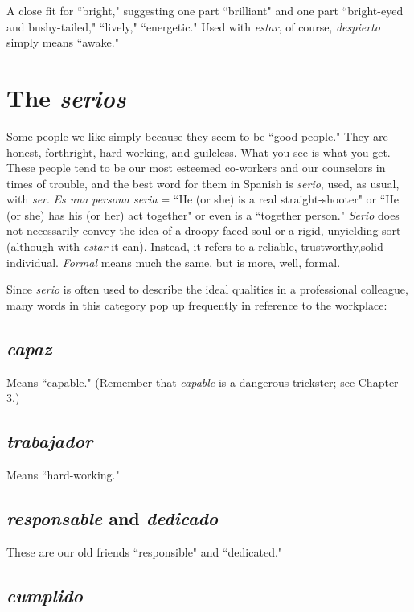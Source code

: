 A close fit for ``bright," suggesting one part ``brilliant" and one part ``bright-eyed and bushy-tailed," ``lively," ``energetic." Used with \emph{estar}, of course, \emph{despierto} simply means ``awake."

\section{The \emph{serios}}

Some people we like simply because they seem to be ``good
people." They are honest, forthright, hard-working, and guileless. What
you see is what you get. These people tend to be our most esteemed
co-workers and our counselors in times of trouble, and the best word
for them in Spanish is \emph{serio}, used, as usual, with \emph{ser}. \emph{Es una persona
	seria} = ``He (or she) is a real straight-shooter" or ``He (or she) has his
(or her) act together" or even is a ``together person." \emph{Serio} does not
necessarily convey the idea of a droopy-faced soul or a rigid, unyielding
sort (although with \emph{estar} it can). Instead, it refers to a reliable, trustworthy,solid individual. \emph{Formal} means much the same, but is more, well, formal.

Since \emph{serio} is often used to describe the ideal qualities in a
professional colleague, many words in this category pop up frequently
in reference to the workplace:

\subsection{\emph{capaz}}

Means ``capable." (Remember that \emph{capable} is a dangerous trickster; see Chapter 3.)

\subsection{\emph{trabajador}}

Means ``hard-working."

\subsection{\emph{responsable} and \emph{dedicado}}

These are our old friends ``responsible" and ``dedicated."

\subsection{\emph{cumplido}}

